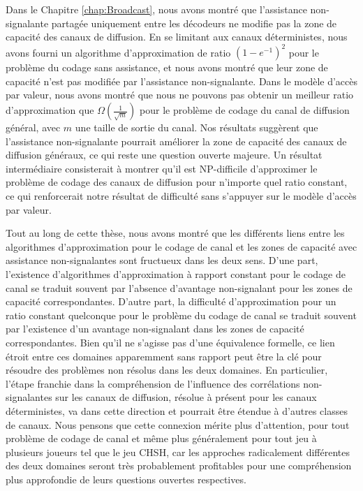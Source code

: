 Dans le Chapitre \ref{chap:Broadcast}, nous avons montré que l'assistance non-signalante partagée uniquement entre les décodeurs ne modifie pas la zone de capacité des canaux de diffusion. En se limitant aux canaux déterministes, nous avons fourni un algorithme d'approximation de ratio $(1-e^{-1})^2$ pour le problème du codage sans assistance, et nous avons montré que leur zone de capacité n'est pas modifiée par l'assistance non-signalante. Dans le modèle d'accès par valeur, nous avons montré que nous ne pouvons pas obtenir un meilleur ratio d'approximation que $\Omega\left(\frac{1}{\sqrt{m}}\right)$ pour le problème de codage du canal de diffusion général, avec $m$ une taille de sortie du canal. Nos résultats suggèrent que l'assistance non-signalante pourrait améliorer la zone de capacité des canaux de diffusion généraux, ce qui reste une question ouverte majeure. Un résultat intermédiaire consisterait à montrer qu'il est \textrm{NP}-difficile d'approximer le problème de codage des canaux de diffusion pour n'importe quel ratio constant, ce qui renforcerait notre résultat de difficulté sans s'appuyer sur le modèle d'accès par valeur.

Tout au long de cette thèse, nous avons montré que les différents liens entre les algorithmes d'approximation pour le codage de canal et les zones de capacité avec assistance non-signalantes sont fructueux dans les deux sens. D'une part, l'existence d'algorithmes d'approximation à rapport constant pour le codage de canal se traduit souvent par l'absence d'avantage non-signalant pour les zones de capacité correspondantes. D'autre part, la difficulté d'approximation pour un ratio constant quelconque pour le problème du codage de canal se traduit souvent par l'existence d'un avantage non-signalant dans les zones de capacité correspondantes. Bien qu'il ne s'agisse pas d'une équivalence formelle, ce lien étroit entre ces domaines apparemment sans rapport peut être la clé pour résoudre des problèmes non résolus dans les deux domaines. En particulier, l'étape franchie dans la compréhension de l'influence des corrélations non-signalantes sur les canaux de diffusion, résolue à présent pour les canaux déterministes, va dans cette direction et pourrait être étendue à d'autres classes de canaux. Nous pensons que cette connexion mérite plus d'attention, pour tout problème de codage de canal et même plus généralement pour tout jeu à plusieurs joueurs tel que le jeu CHSH, car les approches radicalement différentes des deux domaines seront très probablement profitables pour une compréhension plus approfondie de leurs questions ouvertes respectives.

